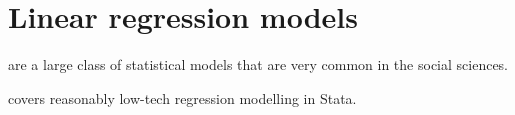 \chapter[Linear models]{Linear regression models}%
	\label{ch:lin}

 are a large class of statistical models that are very common in the social sciences.%

 covers reasonably low-tech regression modelling in Stata.%

%
%
%
%
%
%